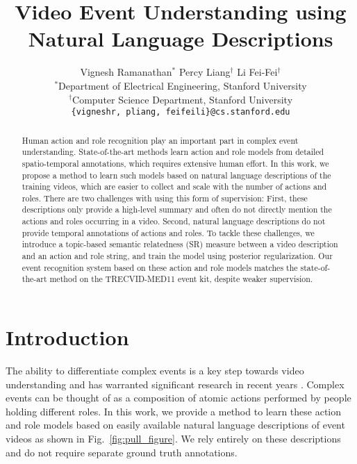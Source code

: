 \documentclass[10pt,twocolumn,letterpaper]{article}
\begin{document}
\title{Video Event Understanding using Natural Language Descriptions}

\author{Vignesh Ramanathan$^*$ \quad \quad Percy Liang$^\dagger$ \quad \quad Li Fei-Fei$^\dagger$ \\
$^*$Department of Electrical Engineering, Stanford University \\
$^\dagger$Computer Science Department, Stanford University\\
{\tt\small \{vigneshr, pliang, feifeili\}@cs.stanford.edu}
}
\maketitle

\begin{abstract}
Human action and role recognition play an important part in complex event understanding. 
State-of-the-art methods learn action and role models from detailed spatio-temporal annotations, 
which requires extensive human effort. 
In this work, we propose a method to learn such models based on natural language descriptions of the training videos, 
which are easier to collect and scale with the number of actions and roles. 
There are two challenges with using this form of supervision: First, these descriptions only provide a high-level summary 
and often do not directly mention the actions and roles occurring in a video. 
Second, natural language descriptions do not provide temporal annotations of actions and roles. 
To tackle these challenges, we introduce a topic-based semantic relatedness (SR) measure between a video description 
and an action and role string, and train the model using posterior regularization. 
Our event recognition system based on these action and role models matches the state-of-the-art method on 
the TRECVID-MED11 event kit, despite weaker supervision. %
\end{abstract}

\section{Introduction}
The ability to differentiate complex events is a key step towards video
understanding and has warranted significant research in recent years
\cite{Merler_ITM12, Izadinia_ECCV12, Rohrbach_ECCV12}. Complex
events can be thought of as a composition of atomic actions performed by
people holding different roles. In this work, we provide a method to
learn these action and role models based on easily available natural language
descriptions of event videos as shown in Fig.~\ref{fig:pull_figure}. We rely
entirely on these descriptions and do not require separate ground truth annotations.
\end{document}
